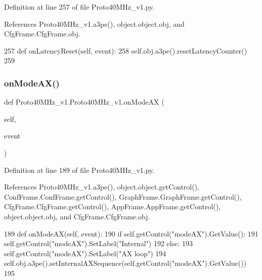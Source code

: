 Definition at line 257 of file Proto40\+M\+Hz\+\_\+v1.\+py.



References Proto40\+M\+Hz\+\_\+v1.\+a3pe(), object.\+object.\+obj, and Cfg\+Frame.\+Cfg\+Frame.\+obj.


\begin{DoxyCode}
257     \textcolor{keyword}{def }onLatencyReset(self, event):
258         self.obj.a3pe().resetLatencyCounter()
259 
\end{DoxyCode}
\mbox{\label{classProto40MHz__v1_1_1Proto40MHz__v1_af871ec7ec3be7b3612c48d26148eaef6}} 
\subsubsection{\texorpdfstring{on\+Mode\+A\+X()}{onModeAX()}}
{\footnotesize\ttfamily def Proto40\+M\+Hz\+\_\+v1.\+Proto40\+M\+Hz\+\_\+v1.\+on\+Mode\+AX (\begin{DoxyParamCaption}\item[{}]{self,  }\item[{}]{event }\end{DoxyParamCaption})}



Definition at line 189 of file Proto40\+M\+Hz\+\_\+v1.\+py.



References Proto40\+M\+Hz\+\_\+v1.\+a3pe(), object.\+object.\+get\+Control(), Conf\+Frame.\+Conf\+Frame.\+get\+Control(), Graph\+Frame.\+Graph\+Frame.\+get\+Control(), Cfg\+Frame.\+Cfg\+Frame.\+get\+Control(), App\+Frame.\+App\+Frame.\+get\+Control(), object.\+object.\+obj, and Cfg\+Frame.\+Cfg\+Frame.\+obj.


\begin{DoxyCode}
189     \textcolor{keyword}{def }onModeAX(self, event):
190         \textcolor{keywordflow}{if} self.getControl(\textcolor{stringliteral}{"modeAX"}).GetValue(): 
191             self.getControl(\textcolor{stringliteral}{"modeAX"}).SetLabel(\textcolor{stringliteral}{"Internal"})
192         \textcolor{keywordflow}{else}:
193             self.getControl(\textcolor{stringliteral}{"modeAX"}).SetLabel(\textcolor{stringliteral}{"AX loop"})
194         self.obj.a3pe().setInternalAXSequence(self.getControl(\textcolor{stringliteral}{"modeAX"}).GetValue())
195             
\end{DoxyCode}
\mbox{\label{classProto40MHz__v1_1_1Proto40MHz__v1_ab8ebf6ec8e0154809593d1d3f16ec818}} 
